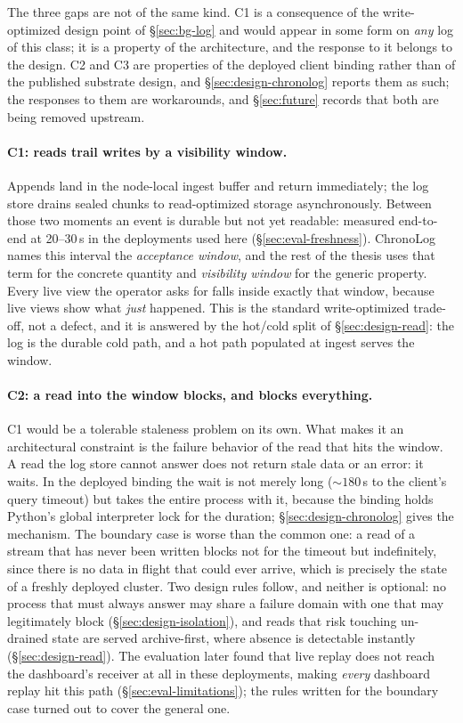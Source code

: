 The three gaps are not of the same kind.
C1 is a consequence of the write-optimized design point of
\S\ref{sec:bg-log} and would appear in some form on \emph{any} log of this
class; it is a property of the architecture, and the response to it belongs
to the design. C2 and C3 are properties of the deployed client binding
rather than of the published substrate design, and
\S\ref{sec:design-chronolog} reports them as such; the responses to them are
workarounds, and \S\ref{sec:future} records that both are being removed
upstream.

\paragraph{C1: reads trail writes by a visibility window.}
Appends land in the node-local ingest buffer and return immediately; the
log store drains sealed chunks to read-optimized storage asynchronously.
Between those two moments an event is
durable but not yet readable: measured end-to-end at 20--30\,s in the
deployments used here (\S\ref{sec:eval-freshness}). ChronoLog names this
interval the \emph{acceptance window}, and the rest of the thesis uses that
term for the concrete quantity and \emph{visibility window} for the generic
property. Every live view the
operator asks for falls inside exactly that window, because live views show
what \emph{just} happened. This is the standard write-optimized trade-off,
not a defect, and it is answered by the hot/cold split of
\S\ref{sec:design-read}: the log is the durable cold path, and a hot path
populated at ingest serves the window.

\paragraph{C2: a read into the window blocks, and blocks everything.}
C1 would be a
tolerable staleness problem on its own. What makes it an architectural
constraint is the failure behavior of the read that hits the window. A
read the log store cannot answer does not return stale data or an error: it
waits. In the deployed binding the wait is not merely long
(${\sim}180$\,s to the client's query timeout) but takes the entire
process with it, because the binding holds Python's global interpreter lock
for the duration; \S\ref{sec:design-chronolog} gives the mechanism. The
boundary case is worse than the common one: a read of a stream that has
never been written blocks not for the timeout but indefinitely, since there
is no data in flight that could ever arrive, which is precisely the state of
a freshly deployed cluster. Two design rules
follow, and neither is optional: no process that must always answer may
share a failure domain with one that may legitimately block
(\S\ref{sec:design-isolation}), and reads that risk touching un-drained
state are served archive-first, where absence is detectable instantly
(\S\ref{sec:design-read}). The evaluation later found that live replay does
not reach the dashboard's receiver at all in these deployments,
making \emph{every} dashboard replay hit this path
(\S\ref{sec:eval-limitations}); the rules written for the boundary case
turned out to cover the general one.

